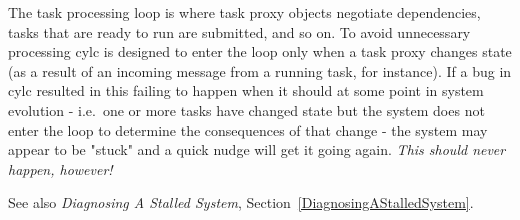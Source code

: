The task processing loop is where task proxy objects negotiate
dependencies, tasks that are ready to run are submitted, and so on. To
avoid unnecessary processing cylc is designed to enter the loop only
when a task proxy changes state (as a result of an incoming message from
a running task, for instance).  If a bug in cylc resulted in this failing
to happen when it should at some point in system evolution - i.e.\ one
or more tasks have changed state but the system does not enter the loop
to determine the consequences of that change - the system may appear to
be "stuck" and a quick nudge will get it going again.  {\em This should
never happen, however!}

See also {\em Diagnosing A Stalled System},
Section~\ref{DiagnosingAStalledSystem}.


